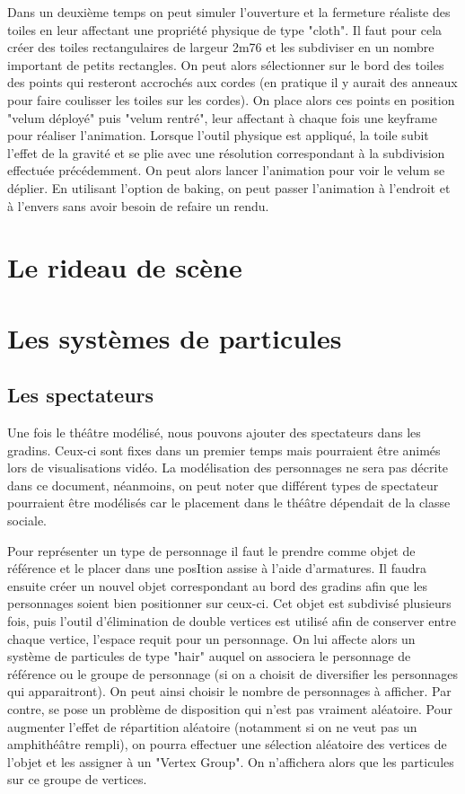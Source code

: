 Dans un deuxième temps on peut simuler l'ouverture et la fermeture réaliste des toiles en leur affectant une propriété physique de type "cloth". Il faut pour cela créer des toiles rectangulaires de largeur 2m76 et les subdiviser en un nombre important de petits rectangles. On peut alors sélectionner sur le bord des toiles des points qui resteront accrochés aux cordes (en pratique il y aurait des anneaux pour faire coulisser les toiles sur les cordes). On place alors ces points en position "velum déployé" puis "velum rentré", leur affectant à chaque fois une \gls{keyframe} pour réaliser l'animation. Lorsque l'outil physique est appliqué, la toile subit l'effet de la gravité et se plie avec une résolution correspondant à la subdivision effectuée précédemment. On peut alors lancer l'animation pour voir le \gls{velum} se déplier. En utilisant l'option de \gls{baking}, on peut passer l'animation à l'endroit et à l'envers sans avoir besoin de refaire un rendu.

\section{Le rideau de scène}


\section{Les systèmes de \glspl{particule}}
\subsection{Les spectateurs}
Une fois le théâtre modélisé, nous pouvons ajouter des spectateurs dans les gradins. Ceux-ci sont fixes dans un premier temps mais pourraient être animés lors de visualisations vidéo. La modélisation des personnages ne sera pas décrite dans ce document, néanmoins, on peut noter que différent types de spectateur pourraient être modélisés car le placement dans le théâtre dépendait de la classe sociale.

Pour représenter un type de personnage il faut le prendre comme objet de référence et le placer dans une posItion assise à l'aide d'\glspl{armature}. Il faudra ensuite créer un nouvel objet correspondant au bord des gradins afin que les personnages soient bien positionner sur ceux-ci. Cet objet est subdivisé plusieurs fois, puis l'outil d'élimination de double vertices est utilisé afin de conserver entre chaque vertice, l'espace requit pour un personnage. On lui affecte alors un système de \glspl{particule} de type "hair" auquel on associera le personnage de référence ou le groupe de personnage (si on a choisit de diversifier les personnages qui apparaitront). On peut ainsi choisir le nombre de personnages à afficher. Par contre, se pose un problème de disposition qui n'est pas vraiment aléatoire. Pour augmenter l'effet de répartition aléatoire (notamment si on ne veut pas un amphithéâtre rempli), on pourra effectuer une sélection aléatoire des vertices de l'objet et les assigner à un "Vertex Group". On n'affichera alors que les particules sur ce groupe de vertices. 


